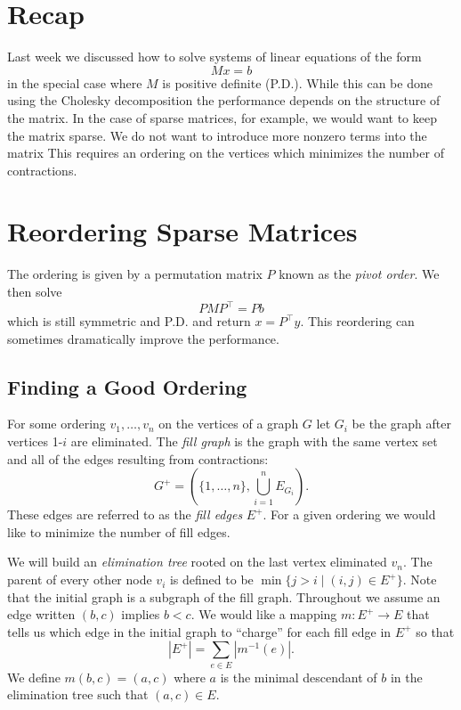 \documentclass{article}
\begin{document}

\section{Recap}

Last week we discussed how to solve systems of linear equations of the form
\[ Mx = b\]
in the special case where $M$ is positive definite (P.D.).
While this can be done using the Cholesky decomposition the performance depends on the structure of the matrix.
In the case of sparse matrices, for example, we would want to keep the matrix sparse.
We do not want to introduce more nonzero terms into the matrix
This requires an ordering on the vertices which minimizes the number of contractions.

\section{Reordering Sparse Matrices}

The ordering is given by a permutation matrix $P$ known as the \emph{pivot order}.
We then solve
\[ P M P^\top = Pb \]
which is still symmetric and P.D. and return $x = P^\top y$.
This reordering can sometimes dramatically improve the performance.

\subsection{Finding a Good Ordering}
For some ordering $v_1,\ldots, v_n$ on the vertices of a graph $G$ let $G_i$ be the graph after vertices 1-$i$ are eliminated.
The \emph{fill graph} is the graph with the same vertex set and all of the edges resulting from contractions:
\[ G^+ = (\{1,\ldots, n\}, \bigcup_{i=1}^n E_{G_i}). \]
These edges are referred to as the \emph{fill edges} $E^+$.
For a given ordering we would like to minimize the number of fill edges.

We will build an \emph{elimination tree} rooted on the last vertex eliminated $v_n$.
The parent of every other node $v_i$ is defined to be $\min\{j > i\mid (i,j)\in E^+\}$.
Note that the initial graph is a subgraph of the fill graph.
Throughout we assume an edge written $(b, c)$ implies $b < c$.
We would like a mapping $m:E^+\to E$ that tells us which edge in the initial graph to ``charge'' for each fill edge in $E^+$ so that
\[ | E^+ | = \sum_{e\in E} |m^{-1}(e)|. \]
We define $m(b, c) = (a, c)$ where $a$ is the minimal descendant of $b$ in the elimination tree such that $(a, c)\in E$.
\end{document}
